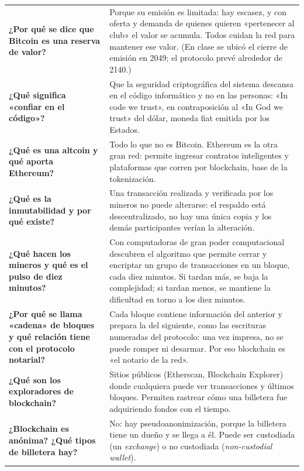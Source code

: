 \documentclass[12pt,oneside]{book}
\begin{document}
\begin{longtable}{
    >{\raggedright\arraybackslash}p{}
    >{\raggedright\arraybackslash}p{}
}
\textbf{¿Por qué se dice que Bitcoin es una reserva de valor?} &
Porque su emisión es limitada: hay escasez, y con oferta y demanda de quienes quieren «pertenecer al club» el valor se acumula. Todos cuidan la red para mantener ese valor. (En clase se ubicó el cierre de emisión en 2049; el protocolo prevé alrededor de 2140.) \\

\textbf{¿Qué significa «confiar en el código»?} &
Que la seguridad criptográfica del sistema descansa en el código informático y no en las personas: «In code we trust», en contraposición al «In God we trust» del dólar, moneda fiat emitida por los Estados. \\

\textbf{¿Qué es una altcoin y qué aporta Ethereum?} &
Todo lo que no es Bitcoin. Ethereum es la otra gran red: permite ingresar contratos inteligentes y plataformas que corren por blockchain, base de la tokenización. \\

\textbf{¿Qué es la inmutabilidad y por qué existe?} &
Una transacción realizada y verificada por los mineros no puede alterarse: el respaldo está descentralizado, no hay una única copia y los demás participantes verían la alteración. \\

\textbf{¿Qué hacen los mineros y qué es el pulso de diez minutos?} &
Con computadoras de gran poder computacional descubren el algoritmo que permite cerrar y encriptar un grupo de transacciones en un bloque, cada diez minutos. Si tardan más, se baja la complejidad; si tardan menos, se mantiene la dificultad en torno a los diez minutos. \\

\textbf{¿Por qué se llama «cadena» de bloques y qué relación tiene con el protocolo notarial?} &
Cada bloque contiene información del anterior y prepara la del siguiente, como las escrituras numeradas del protocolo: una vez impresa, no se puede romper ni desarmar. Por eso blockchain es «el notario de la red». \\

\textbf{¿Qué son los exploradores de blockchain?} &
Sitios públicos (Etherscan, Blockchain Explorer) donde cualquiera puede ver transacciones y últimos bloques. Permiten rastrear cómo una billetera fue adquiriendo fondos con el tiempo. \\

\textbf{¿Blockchain es anónima? ¿Qué tipos de billetera hay?} &
No: hay pseudoanonimización, porque la billetera tiene un dueño y se llega a él. Puede ser custodiada (un \textit{exchange}) o no custodiada (\textit{non-custodial wallet}). \\


\end{longtable}
\end{document}
